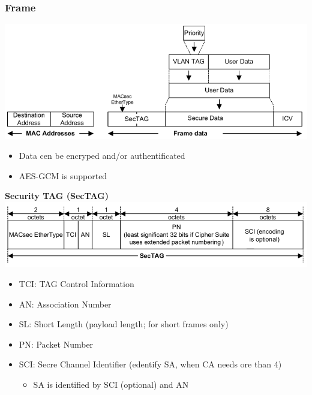  \subsubsection{Frame}
 \includegraphics[width=0.8\columnwidth]{Resources/macsec_frame.png}
 \begin{itemize}
  \item Data cen be encryped and/or authentificated
  \item AES-GCM is supported
 \end{itemize}
 \textbf{Security TAG (SecTAG)}\\
 \includegraphics[width=0.8\columnwidth]{Resources/sec_tag.png}
 \begin{itemize}
  \item TCI: TAG Control Information
  \item AN: Association Number
  \item SL: Short Length (payload length; for short frames only)
  \item PN: Packet Number
  \item SCI: Secre Channel Identifier (edentify SA, when CA needs ore than 4)
    \begin{itemize}
      \item SA is identified by SCI (optional) and AN
    \end{itemize}
 \end{itemize}

